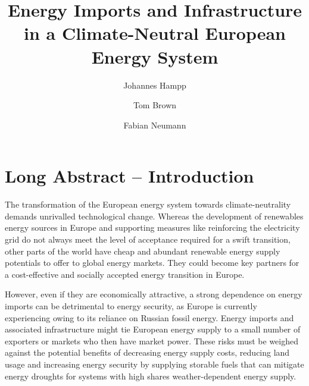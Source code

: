 \documentclass[10pt,5p,reversenotenum,lefttitle]{elsarticle}
\begin{document}
\begin{frontmatter}

	\title{Energy Imports and Infrastructure in a Climate-Neutral European Energy System}

	\author[jlu]{Johannes Hampp}
    \author[tub]{Tom Brown}
	\author[tub]{Fabian Neumann}
	\address[jlu]{Center for International Development and Environmental Research, Justus-Liebig-University Gießen, Gießen, Germany}
	\address[tub]{Department of Digital Transformation in Energy Systems, Institute of Energy Technology, Technische Universität Berlin, Fakultät III, Einsteinufer 25 (TA 8), 10587 Berlin, Germany}

\end{frontmatter}

\section*{Long Abstract -- Introduction}

The transformation of the European energy system towards climate-neutrality
demands unrivalled technological change. Whereas the development of renewables
energy sources in Europe and supporting measures like reinforcing the
electricity grid do not always meet the level of acceptance required for a swift
transition, other parts of the world have cheap and abundant renewable energy
supply potentials to offer to global energy
markets.\cite{irenaGlobalHydrogen2022,luxSupplyCurves2021,vanderzwaanTimmermansDream2021,fasihiLongTermHydrocarbon2017,reichenbergDeepDecarbonization2022,galvanExportingSunshine2022,armijoFlexibleProduction2020,pfennigGlobalGISbased2022}
They could become key partners for a cost-effective and socially accepted energy
transition in Europe.

However, even if they are economically attractive, a strong dependence on energy
imports can be detrimental to energy security, as Europe is currently
experiencing owing to its reliance on Russian fossil
energy.\cite{pedersenLongtermImplications2022} Energy imports and associated
infrastructure might tie European energy supply to a small number of exporters
or markets who then have market power. These risks must be weighed against the
potential benefits of decreasing energy supply costs, reducing land usage and
increasing energy security by supplying storable fuels that can mitigate energy
droughts for systems with high shares weather-dependent energy supply.
\end{document}
